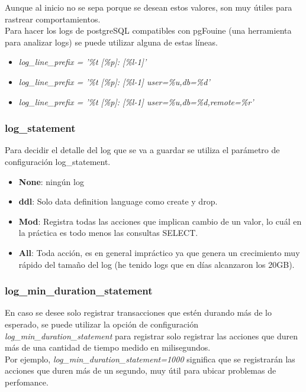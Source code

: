 Aunque al inicio no se sepa porque se desean estos valores, son muy útiles para rastrear comportamientos.\\

Para hacer los logs de postgreSQL compatibles con pgFouine (una herramienta para analizar logs) se puede utilizar alguna de estas líneas.

\begin{itemize}
\item \emph{log\_line\_prefix = '\%t [\%p]: [\%l-1]' }
\item \emph{log\_line\_prefix = '\%t [\%p]: [\%l-1] user=\%u,db=\%d'}
\item \emph{log\_line\_prefix = '\%t [\%p]: [\%l-1] user=\%u,db=\%d,remote=\%r'}
\end{itemize}

\subsubsection{log\_statement}

Para decidir el detalle del log que se va a guardar se utiliza el parámetro de configuración log\_statement.

\begin{itemize}
\item \textbf{None}: ningún log
\item \textbf{ddl}: Solo data definition language como create y drop.
\item \textbf{Mod}: Registra todas las acciones que implican cambio de un valor, lo cuál en la práctica es todo menos las consultas SELECT.
\item \textbf{All}: Toda acción, es en general impráctico ya que genera un crecimiento muy rápido del tamaño del log (he tenido logs que en días alcanzaron los 20GB).
\end{itemize}

\subsubsection{log\_min\_duration\_statement}

En caso se desee solo registrar transacciones que estén durando más de lo esperado, se puede utilizar la opción de configuración \emph{log\_min\_duration\_statement} para registrar solo registrar las acciones que duren más de una cantidad de tiempo medido en milisegundos.\\

Por ejemplo, \emph{log\_min\_duration\_statement=1000} significa que se registrarán las acciones que duren más de un segundo, muy útil para ubicar problemas de perfomance.

